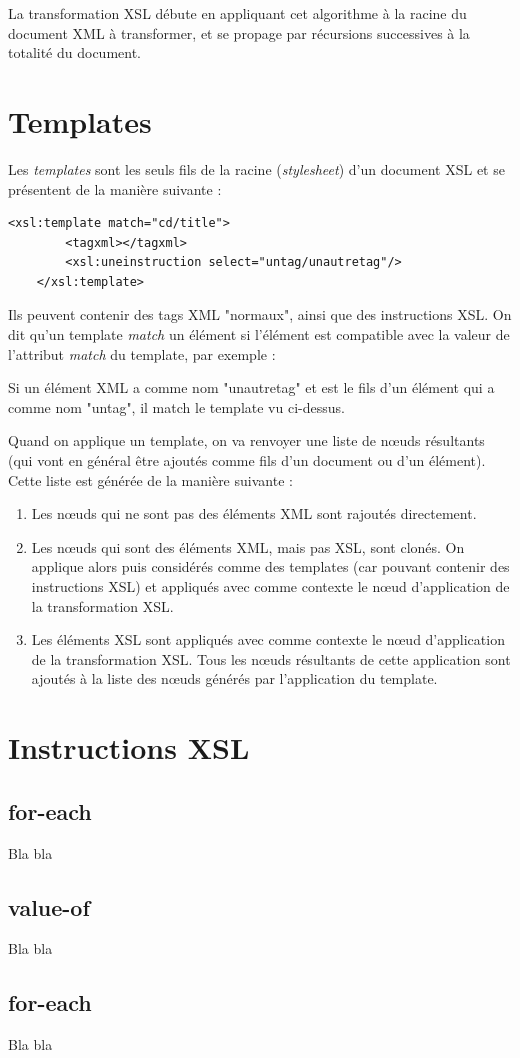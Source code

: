 La transformation XSL débute en appliquant cet algorithme à la racine du document XML à transformer, et se propage par récursions successives
à la totalité du document.

\section{Templates}

Les \textit{templates} sont les seuls fils de la racine (\textit{stylesheet}) d'un document XSL et se présentent de la manière suivante :

\begin{lstlisting}[frame=single]
    <xsl:template match="cd/title">
        <tagxml></tagxml>
        <xsl:uneinstruction select="untag/unautretag"/>
    </xsl:template>
\end{lstlisting}

Ils peuvent contenir des tags XML "normaux", ainsi que des instructions XSL.
On dit qu'un template \textit{match} un élément si l'élément est compatible avec la valeur de l'attribut \textit{match} du template, par exemple :

Si un élément XML a comme nom "unautretag" et est le fils d'un élément qui a comme nom "untag", il match le template vu ci-dessus.

Quand on applique un template, on va renvoyer une liste de nœuds résultants (qui vont en général être ajoutés comme fils d'un document ou d'un élément). Cette liste est générée de la manière suivante :\\

\begin{enumerate}
    \item Les nœuds qui ne sont pas des éléments XML sont rajoutés directement.
    \item Les nœuds qui sont des éléments XML, mais pas XSL, sont clonés. On applique alors  puis considérés comme des templates (car pouvant contenir des instructions XSL) et appliqués avec comme contexte le nœud d'application de la transformation XSL.
    \item Les éléments XSL sont appliqués avec comme contexte le nœud d'application de la transformation XSL. Tous les nœuds résultants de cette application sont ajoutés à la liste des nœuds générés par l'application du template.
\end{enumerate}

\section{Instructions XSL}

    \subsection{for-each}
        Bla bla

    \subsection{value-of}
        Bla bla

    \subsection{for-each}
        Bla bla